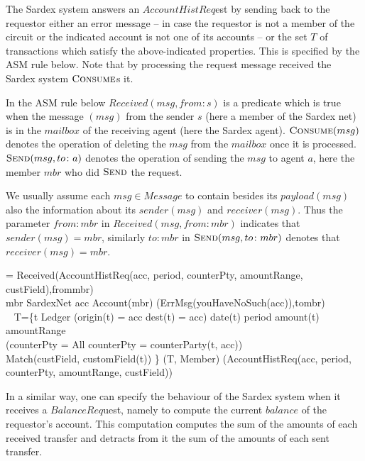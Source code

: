 The Sardex system answers an $AccountHistReq$est by sending back to the requestor either an error message -- in case the requestor is not a member of the circuit or the indicated account is not one of its accounts -- or the set $T$ of transactions which satisfy the above-indicated properties. This is specified by the ASM rule below. Note that by processing the request message received the Sardex system $\hbox{\sc Consume}$s it.


In the ASM rule below $Received(msg,from\colon s)$ is a predicate which is true when the message $(msg)$ from the sender $s$ (here a member of the Sardex net) is in the $mailbox$ of the receiving agent (here the Sardex agent). $\hbox{\sc Consume}(msg)$ denotes the operation of deleting the $msg$ from the $mailbox$ once it is processed. $\hbox{\sc Send}(msg,to\colon a)$ denotes the operation of sending the $msg$ to agent $a$, here the member $mbr$ who did $\hbox{\sc Send}$ the request. 

We usually assume  each $msg \in Message$ to contain besides its $payload(msg)$ also the information about its $sender(msg)$ and $receiver(msg)$. Thus the parameter $from:mbr$ in $Received(msg,from\colon mbr)$ indicates that $sender(msg)=mbr$, similarly $to:mbr$ in $\hbox{\sc Send}(msg,to\colon mbr)$ denotes that\\ $receiver(msg) = mbr$.

\begin{asm}
=\+
   \IF Received(AccountHistReq(acc, period, counterPty, amountRange, custField),from\colon mbr)\\
   \THEN \+
     \IF mbr \not \in SardexNet \OR acc \not\in Account(mbr) \+
       \THEN {}(ErrMsg(youHaveNoSuch(acc)),to\colon mbr)\\
       \ELSE ~ \LET T=\{t \in Ledger \mid (origin(t) = acc \OR dest(t) = acc) \+
           \AND date(t) \in period \AND amount(t) \in amountRange \\
           \AND (\IF counterPty \not = All \THEN 
                counterPty = counterParty(t, acc))\\
           \AND Match(custField, customField(t)) \} \IN \+
                 (T, Member)\dec\dec\-
     (AccountHistReq(acc, period, counterPty, amountRange, custField))
\end{asm}

In a similar way, one can specify the behaviour of the Sardex system when it receives a $BalanceReq$uest, namely to compute the current $balance$ of the requestor's account. This computation computes the sum of the amounts of each received transfer and detracts from it the sum of the amounts of each sent transfer.

